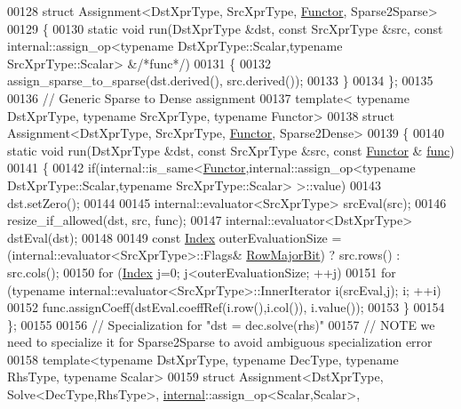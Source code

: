 \begin{DoxyCode}
00128 \textcolor{keyword}{struct }Assignment<DstXprType, SrcXprType, \hyperlink{struct_functor}{Functor}, Sparse2Sparse>
00129 \{
00130   \textcolor{keyword}{static} \textcolor{keywordtype}{void} run(DstXprType &dst, \textcolor{keyword}{const} SrcXprType &src, \textcolor{keyword}{const} internal::assign\_op<typename
       DstXprType::Scalar,typename SrcXprType::Scalar> &\textcolor{comment}{/*func*/})
00131   \{
00132     assign\_sparse\_to\_sparse(dst.derived(), src.derived());
00133   \}
00134 \};
00135 
00136 \textcolor{comment}{// Generic Sparse to Dense assignment}
00137 \textcolor{keyword}{template}< \textcolor{keyword}{typename} DstXprType, \textcolor{keyword}{typename} SrcXprType, \textcolor{keyword}{typename} Functor>
00138 \textcolor{keyword}{struct }Assignment<DstXprType, SrcXprType, \hyperlink{struct_functor}{Functor}, Sparse2Dense>
00139 \{
00140   \textcolor{keyword}{static} \textcolor{keywordtype}{void} run(DstXprType &dst, \textcolor{keyword}{const} SrcXprType &src, \textcolor{keyword}{const} \hyperlink{struct_functor}{Functor} &
      \hyperlink{structfunc}{func})
00141   \{
00142     \textcolor{keywordflow}{if}(internal::is\_same<\hyperlink{struct_functor}{Functor},internal::assign\_op<typename DstXprType::Scalar,typename
       SrcXprType::Scalar> >::value)
00143       dst.setZero();
00144     
00145     internal::evaluator<SrcXprType> srcEval(src);
00146     resize\_if\_allowed(dst, src, func);
00147     internal::evaluator<DstXprType> dstEval(dst);
00148     
00149     \textcolor{keyword}{const} \hyperlink{namespace_eigen_a62e77e0933482dafde8fe197d9a2cfde}{Index} outerEvaluationSize = (internal::evaluator<SrcXprType>::Flags&
      \hyperlink{group__flags_gae4f56c2a60bbe4bd2e44c5b19cbe8762}{RowMajorBit}) ? src.rows() : src.cols();
00150     \textcolor{keywordflow}{for} (\hyperlink{namespace_eigen_a62e77e0933482dafde8fe197d9a2cfde}{Index} j=0; j<outerEvaluationSize; ++j)
00151       \textcolor{keywordflow}{for} (\textcolor{keyword}{typename} internal::evaluator<SrcXprType>::InnerIterator i(srcEval,j); i; ++i)
00152         func.assignCoeff(dstEval.coeffRef(i.row(),i.col()), i.value());
00153   \}
00154 \};
00155 
00156 \textcolor{comment}{// Specialization for "dst = dec.solve(rhs)"}
00157 \textcolor{comment}{// NOTE we need to specialize it for Sparse2Sparse to avoid ambiguous specialization error}
00158 \textcolor{keyword}{template}<\textcolor{keyword}{typename} DstXprType, \textcolor{keyword}{typename} DecType, \textcolor{keyword}{typename} RhsType, \textcolor{keyword}{typename} Scalar>
00159 \textcolor{keyword}{struct }Assignment<DstXprType, Solve<DecType,RhsType>, \hyperlink{namespaceinternal}{internal}::assign\_op<Scalar,Scalar>, 

\end{DoxyCode}
